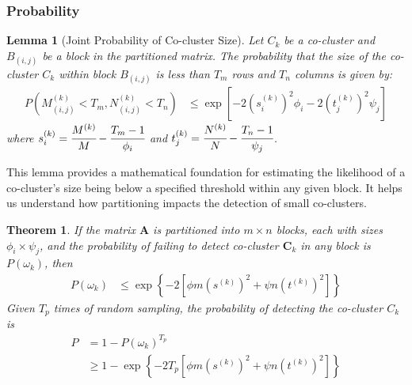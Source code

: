 \documentclass[journal]{IEEEtran}
\newtheorem{theorem}{Theorem}
\newtheorem{lemma}{Lemma}
\begin{document}
\subsubsection{Probability}

\begin{lemma}[Joint Probability of Co-cluster Size]
  \label{thm:joint_probability}
  Let $C_k$ be a co-cluster and $B_{(i,j)}$ be a block in the partitioned matrix. The probability that the size of the co-cluster $C_k$ within block $B_{(i,j)}$ is less than $T_m$ rows and $T_n$ columns is given by:
  \begin{equation}
    \begin{split}
      P(M_{(i,j)}^{(k)} < T_m, N_{(i,j)}^{(k)} < T_n) & \le \exp[-2 (s_i^{(k)})^2 \phi_i -2 (t_j^{(k)})^2 \psi_j]
    \end{split}
  \end{equation}
  where $s_i^{(k)} = \cfrac{M^{(k)}}{M}-\cfrac{T_m-1}{\phi_i}$ and $t_j^{(k)} = \cfrac{N^{(k)}}{N}-\cfrac{T_n-1}{\psi_j}$.
\end{lemma}

This lemma provides a mathematical foundation for estimating the likelihood of a co-cluster's size being below a specified threshold within any given block. It helps us understand how partitioning impacts the detection of small co-clusters.

\begin{theorem}
  \label{thm:probability_co_cluster_detection}
  If the matrix $\mathbf{A}$ is partitioned into $m \times n$ blocks, each with sizes $\phi_i \times \psi_j$, and the probability of failing to detect co-cluster $\mathbf{C}_k$ in any block is $P(\omega_k)$, then
  \begin{equation}
    \begin{split}
      P(\omega_k) & \le \exp \left\{ -2 [\phi m (s^{(k)})^2 + \psi n (t^{(k)})^2] \right\}
    \end{split}
  \end{equation}
  Given $T_p$ times of random sampling, the probability of detecting the co-cluster $C_k$ is
  \begin{equation}
    \begin{split}
      P & = 1 - P(\omega_k)^{T_p}                                                        \\
        & \ge 1 - \exp \left\{ -2 T_p [\phi m (s^{(k)})^2 + \psi n (t^{(k)})^2] \right\}
    \end{split}
  \end{equation}

\end{theorem}
\end{document}
